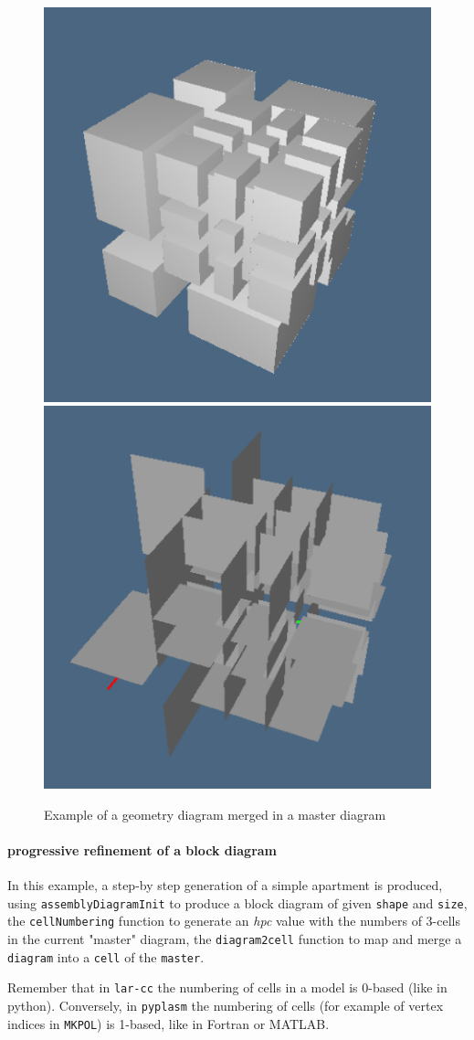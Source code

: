 \documentclass[11pt,oneside]{article}	%
\begin{document}
\begin{figure}[htbp] %
   \centering
   \includegraphics[height=0.49\linewidth,width=0.49\linewidth]{images/mastermerged} 
   \includegraphics[height=0.49\linewidth,width=0.49\linewidth]{images/masterfacets} 
   \caption{Example of a geometry diagram merged in a master diagram}
   \label{fig:mastermerged}
\end{figure}


\paragraph{progressive refinement of a block diagram}

In this example, a step-by step generation of a simple apartment is produced, using 
\texttt{assemblyDiagramInit} to produce a block diagram of given \texttt{shape} and 
\texttt{size}, the \texttt{cellNumbering} function to generate an \emph{hpc} value
with the numbers of 3-cells in the current "master" diagram, the \texttt{diagram2cell}
function to map and merge a \texttt{diagram} into a \texttt{cell} of the \texttt{master}.

Remember that in \texttt{lar-cc} the numbering of cells in a model is 0-based (like
in python). Conversely, in \texttt{pyplasm} the numbering of cells (for example of 
vertex indices in \texttt{MKPOL}) is 1-based, like in Fortran or MATLAB.   
\end{document}
